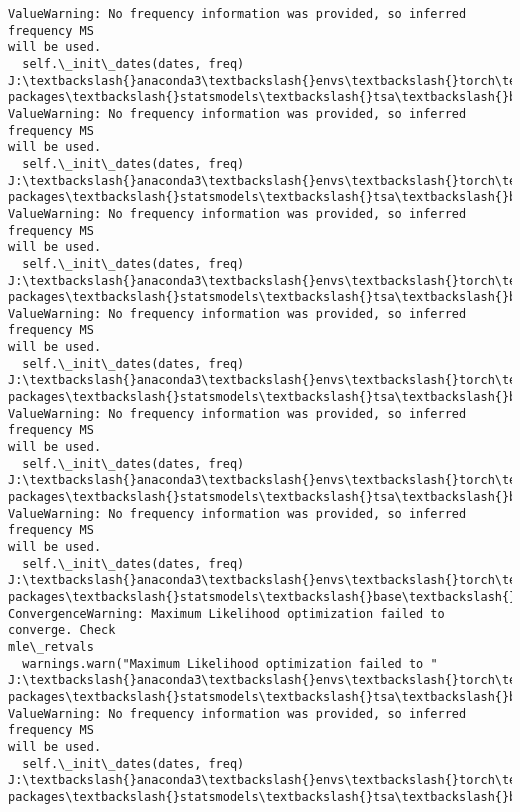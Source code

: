 \documentclass[11pt]{article}
\begin{document}
\begin{Verbatim}[commandchars=\\\{\}]
ValueWarning: No frequency information was provided, so inferred frequency MS
will be used.
  self.\_init\_dates(dates, freq)
J:\textbackslash{}anaconda3\textbackslash{}envs\textbackslash{}torch\textbackslash{}Lib\textbackslash{}site-packages\textbackslash{}statsmodels\textbackslash{}tsa\textbackslash{}base\textbackslash{}tsa\_model.py:473:
ValueWarning: No frequency information was provided, so inferred frequency MS
will be used.
  self.\_init\_dates(dates, freq)
J:\textbackslash{}anaconda3\textbackslash{}envs\textbackslash{}torch\textbackslash{}Lib\textbackslash{}site-packages\textbackslash{}statsmodels\textbackslash{}tsa\textbackslash{}base\textbackslash{}tsa\_model.py:473:
ValueWarning: No frequency information was provided, so inferred frequency MS
will be used.
  self.\_init\_dates(dates, freq)
J:\textbackslash{}anaconda3\textbackslash{}envs\textbackslash{}torch\textbackslash{}Lib\textbackslash{}site-packages\textbackslash{}statsmodels\textbackslash{}tsa\textbackslash{}base\textbackslash{}tsa\_model.py:473:
ValueWarning: No frequency information was provided, so inferred frequency MS
will be used.
  self.\_init\_dates(dates, freq)
J:\textbackslash{}anaconda3\textbackslash{}envs\textbackslash{}torch\textbackslash{}Lib\textbackslash{}site-packages\textbackslash{}statsmodels\textbackslash{}tsa\textbackslash{}base\textbackslash{}tsa\_model.py:473:
ValueWarning: No frequency information was provided, so inferred frequency MS
will be used.
  self.\_init\_dates(dates, freq)
J:\textbackslash{}anaconda3\textbackslash{}envs\textbackslash{}torch\textbackslash{}Lib\textbackslash{}site-packages\textbackslash{}statsmodels\textbackslash{}tsa\textbackslash{}base\textbackslash{}tsa\_model.py:473:
ValueWarning: No frequency information was provided, so inferred frequency MS
will be used.
  self.\_init\_dates(dates, freq)
J:\textbackslash{}anaconda3\textbackslash{}envs\textbackslash{}torch\textbackslash{}Lib\textbackslash{}site-packages\textbackslash{}statsmodels\textbackslash{}base\textbackslash{}model.py:607:
ConvergenceWarning: Maximum Likelihood optimization failed to converge. Check
mle\_retvals
  warnings.warn("Maximum Likelihood optimization failed to "
J:\textbackslash{}anaconda3\textbackslash{}envs\textbackslash{}torch\textbackslash{}Lib\textbackslash{}site-packages\textbackslash{}statsmodels\textbackslash{}tsa\textbackslash{}base\textbackslash{}tsa\_model.py:473:
ValueWarning: No frequency information was provided, so inferred frequency MS
will be used.
  self.\_init\_dates(dates, freq)
J:\textbackslash{}anaconda3\textbackslash{}envs\textbackslash{}torch\textbackslash{}Lib\textbackslash{}site-packages\textbackslash{}statsmodels\textbackslash{}tsa\textbackslash{}base\textbackslash{}tsa\_model.py:473:

\end{Verbatim}
\end{document}
